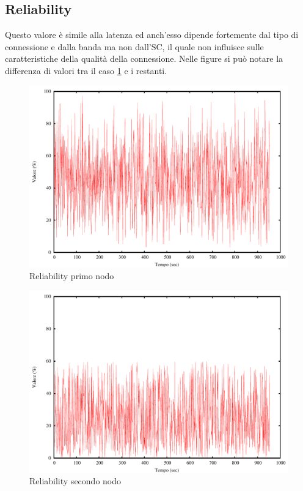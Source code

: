 \subsection{Reliability}
Questo valore è simile alla latenza ed anch'esso dipende fortemente dal tipo di connessione e dalla banda ma non dall'SC, il quale non influisce sulle caratteristiche della qualità della connessione. Nelle figure si può notare la differenza di valori tra il caso \ref{fig:reliability1} e i restanti.
\begin{figure}[H]
\begin{center}
\includegraphics[scale=0.6]{etc/reliability1.pdf}
\caption{Reliability primo nodo}
\label{fig:reliability1}
\end{center}
\end{figure}
\begin{figure}[H]
\begin{center}
\includegraphics[scale=0.6]{etc/reliability2.pdf}
\caption{Reliability secondo nodo}
\label{fig:reliability2}
\end{center}
\end{figure}
